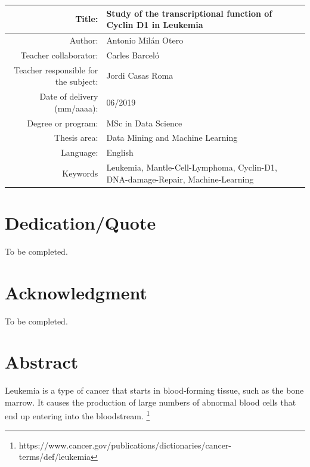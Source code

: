 \begin{table}[ht]
	\centering{}
	\renewcommand{\arraystretch}{2}
	\begin{tabular}{r | p{8cm}}
		\hline
		Title: & Study of the transcriptional function \newline of Cyclin D1 in Leukemia\\
		\hline
        Author: & Antonio Milán Otero\\
		\hline
        Teacher collaborator: & Carles Barceló\\
		\hline
        Teacher responsible for the subject: & Jordi Casas Roma\\
		\hline
        Date of delivery (mm/aaaa): & 06/2019\\
		\hline
        Degree or program: & MSc in Data Science\\
		\hline
        Thesis area: & Data Mining and Machine Learning\\
		\hline
        Language: & English\\
		\hline
        Keywords & Leukemia, Mantle-Cell-Lymphoma, Cyclin-D1, DNA-damage-Repair, Machine-Learning\\
		\hline
	\end{tabular}
\end{table}

\chapter*{Dedication/Quote}

To be completed.

\chapter*{Acknowledgment}

To be completed.

\chapter*{Abstract}

\onehalfspacing

Leukemia is a type of cancer that starts in blood-forming tissue, such as the bone marrow. It causes the production of large numbers of abnormal blood cells that end up entering into the bloodstream. \footnote{https://www.cancer.gov/publications/dictionaries/cancer-terms/def/leukemia}

